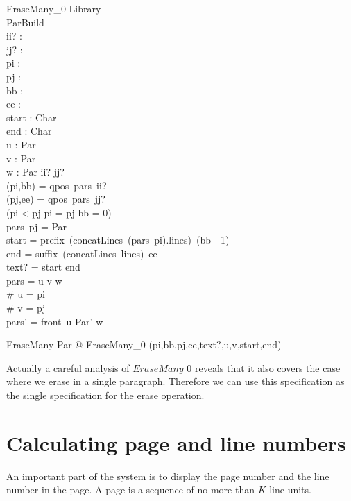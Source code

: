 \documentclass{article}
\begin{document}
\begin{schema}{EraseMany\_0}
	\Delta Library \\
	ParBuild \\
	ii? : \nat \\
	jj? : \nat \\
	pi : \nat \\
	pj : \nat \\
	bb : \nat \\
	ee : \nat \\
	start : \seq Char \\
	end : \seq Char \\
	u : \seq Par \\
	v : \seq Par \\
	w : \seq Par 
\where
	ii? \leq jj? \\
	(pi,bb) = qpos~pars~ii? \\
	(pj,ee) = qpos~pars~jj? \\
	(pi < pj \lor pi = pj \land bb = 0) \\
	pars~pj = \theta Par \\
	start = prefix~(concatLines~(pars~pi).lines)~(bb - 1) \\
	end = suffix~(concatLines~lines)~ee \\
	text? = start \cat end \\
	pars = u \cat v \cat w \\
	\# u = pi \\
	\# v = pj \\
	pars' = front~u \cat \langle \theta Par' \rangle \cat w \\
\end{schema}

\begin{zed}
EraseMany  \exists \Delta Par @ EraseMany\_0 \hide (pi,bb,pj,ee,text?,u,v,start,end)
\end{zed}

Actually a careful analysis of $EraseMany\_0$ reveals that it also covers the case where we erase in a single paragraph. Therefore we can use this specification as the single specification for the erase operation.

\section{Calculating page and line numbers}

An important part of the system is to display the page number and the line number in the page. A page is a sequence of no more than $K$ line units. 
\end{document}
